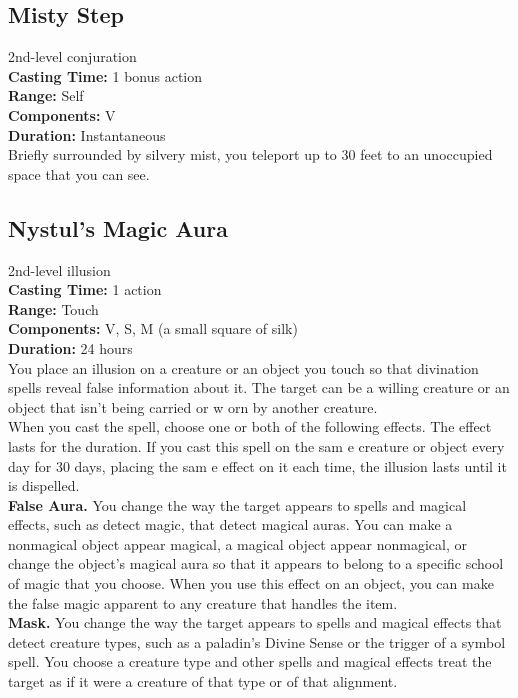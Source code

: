 \documentclass[11pt, A4paper, english]{article}
\begin{document}
		\subsection{Misty Step}
2nd-level conjuration \\
\textbf{Casting Time:} 1 bonus action \\
\textbf{Range:} Self \\
\textbf{Components:} V \\
\textbf{Duration:} Instantaneous \\
Briefly surrounded by silvery mist, you teleport up to 30 feet to an unoccupied space that you can see.

		\subsection{Nystul's Magic Aura}
2nd-level illusion \\
\textbf{Casting Time:} 1 action \\
\textbf{Range:} Touch \\
\textbf{Components:} V, S, M (a small square of silk) \\
\textbf{Duration:} 24 hours \\
You place an illusion on a creature or an object you touch so that divination spells reveal false information about it. The target can be a willing creature or an object that isn’t being carried or w orn by another creature. \\
When you cast the spell, choose one or both of the following effects. The effect lasts for the duration. If you cast this spell on the sam e creature or object every day for 30 days, placing the sam e effect on it each time, the illusion lasts until it is dispelled. \\
\textbf{False Aura.} You change the way the target appears to spells and magical effects, such as detect magic, that detect magical auras. You can make a nonmagical object appear magical, a magical object appear nonmagical, or change the object’s magical aura so that it appears to belong to a specific school of magic that you choose. When you use this effect on an object, you
can make the false magic apparent to any creature that handles the item. \\
\textbf{Mask.} You change the way the target appears to spells and magical effects that detect creature types, such as a paladin's Divine Sense or the trigger of a symbol spell. You choose a creature type and other spells and magical effects treat the target as if it were a creature of that type or of that alignment.
\end{document}

